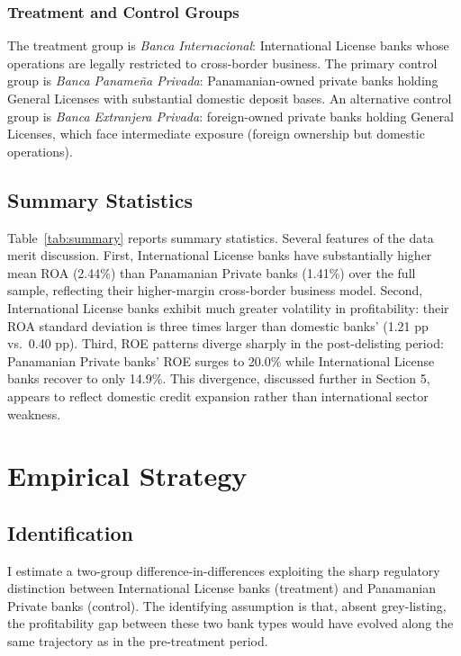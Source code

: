 \documentclass[12pt]{article}
\begin{document}
\subsubsection*{Treatment and Control Groups}
The treatment group is \textit{Banca Internacional}: International License banks whose operations are legally restricted to cross-border business. The primary control group is \textit{Banca Paname\~na Privada}: Panamanian-owned private banks holding General Licenses with substantial domestic deposit bases. An alternative control group is \textit{Banca Extranjera Privada}: foreign-owned private banks holding General Licenses, which face intermediate exposure (foreign ownership but domestic operations).

\subsection{Summary Statistics}



Table~\ref{tab:summary} reports summary statistics. Several features of the data merit discussion. First, International License banks have substantially higher mean ROA (2.44\%) than Panamanian Private banks (1.41\%) over the full sample, reflecting their higher-margin cross-border business model. Second, International License banks exhibit much greater volatility in profitability: their ROA standard deviation is three times larger than domestic banks' (1.21 pp vs.\ 0.40 pp). Third, ROE patterns diverge sharply in the post-delisting period: Panamanian Private banks' ROE surges to 20.0\% while International License banks recover to only 14.9\%. This divergence, discussed further in Section 5, appears to reflect domestic credit expansion rather than international sector weakness.


\section{Empirical Strategy}

\subsection{Identification}

I estimate a two-group difference-in-differences exploiting the sharp regulatory distinction between International License banks (treatment) and Panamanian Private banks (control). The identifying assumption is that, absent grey-listing, the profitability gap between these two bank types would have evolved along the same trajectory as in the pre-treatment period.
\end{document}
